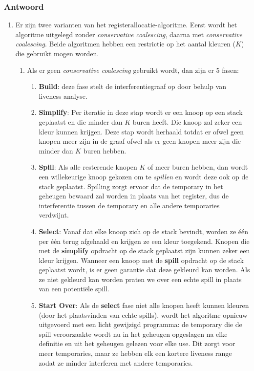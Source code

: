 \documentclass{report}
\newcommand{\answer}[1]{
		\subsubsection*{Antwoord}
			#1
}
\begin{document}
	\answer{
		\begin{enumerate}
			\item Er zijn twee varianten van het registerallocatie-algoritme. Eerst wordt het algoritme uitgelegd zonder \textit{conservative coalescing}, daarna met \textit{conservative coalescing}. Beide algoritmen hebben een restrictie op het aantal kleuren ($K$) die gebruikt mogen worden.
			\begin{enumerate}
				\item Als er geen \textit{conservative coalescing} gebruikt wordt, dan zijn er 5 fasen:
				\begin{enumerate}
					\item \textbf{Build}: deze fase stelt de interferentiegraaf op door behulp van liveness analyse.
					\item \textbf{Simplify}: Per iteratie in deze stap wordt er een knoop op een stack geplaatst en die minder dan $K$ buren heeft. Die knoop zal zeker een kleur kunnen krijgen. Deze stap wordt herhaald totdat er ofwel geen knopen meer zijn in de graaf ofwel als er geen knopen meer zijn die minder dan $K$ buren hebben.
					\item \textbf{Spill}: Als alle resterende knopen $K$ of meer buren hebben, dan wordt een willekeurige knoop gekozen om te \textit{spillen} en wordt deze ook op de stack geplaatst. Spilling zorgt ervoor dat de temporary in het geheugen bewaard zal worden in plaats van het register, dus de interferentie tussen de temporary en alle andere temporaries verdwijnt.
					\item \textbf{Select}: Vanaf dat elke knoop zich op de stack bevindt, worden ze één per één terug afgehaald en krijgen ze een kleur toegekend. Knopen die met de \textbf{simplify} opdracht op de stack geplaatst zijn kunnen zeker een kleur krijgen. Wanneer een knoop met de \textbf{spill} opdracht op de stack geplaatst wordt, is er geen garantie dat deze gekleurd kan worden. Als ze niet gekleurd kan worden praten we over een echte spill in plaats van een potentiële spill.
					\item \textbf{Start Over}: Als de \textbf{select} fase niet alle knopen heeft kunnen kleuren (door het plaatsvinden van echte spills), wordt het algoritme opnieuw uitgevoerd met een licht gewijzigd programma: de temporary die de spill veroorzaakte wordt nu in het geheugen opgeslagen na elke definitie en uit het geheugen gelezen voor elke use. Dit zorgt voor meer temporaries, maar ze hebben elk een kortere liveness range zodat ze minder interferen met andere temporaries.
				\end{enumerate}

\end{enumerate}
\end{enumerate}}
\end{document}
